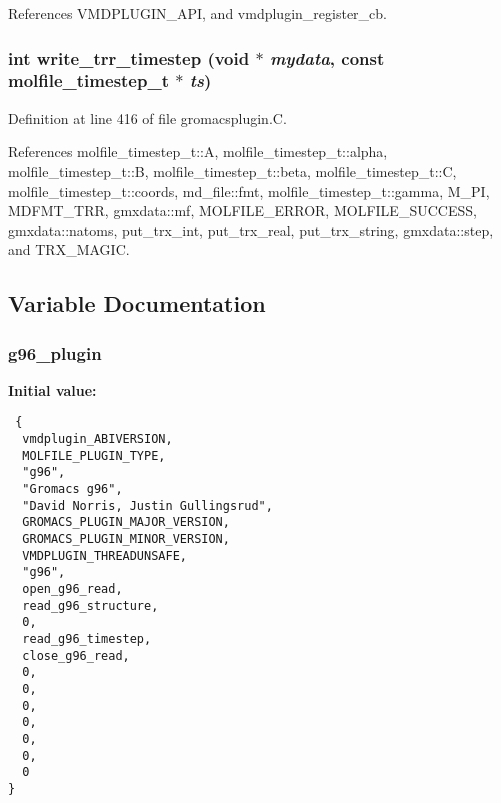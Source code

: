 References VMDPLUGIN\_\-API, and vmdplugin\_\-register\_\-cb.
\subsubsection{\setlength{\rightskip}{0pt plus 5cm}int write\_\-trr\_\-timestep (void $\ast$ {\em mydata}, const {\bf molfile\_\-timestep\_\-t} $\ast$ {\em ts})\hspace{0.3cm}{\tt  [static]}}\label{gromacsplugin_8C_a19}




Definition at line 416 of file gromacsplugin.C.

References molfile\_\-timestep\_\-t::A, molfile\_\-timestep\_\-t::alpha, molfile\_\-timestep\_\-t::B, molfile\_\-timestep\_\-t::beta, molfile\_\-timestep\_\-t::C, molfile\_\-timestep\_\-t::coords, md\_\-file::fmt, molfile\_\-timestep\_\-t::gamma, M\_\-PI, MDFMT\_\-TRR, gmxdata::mf, MOLFILE\_\-ERROR, MOLFILE\_\-SUCCESS, gmxdata::natoms, put\_\-trx\_\-int, put\_\-trx\_\-real, put\_\-trx\_\-string, gmxdata::step, and TRX\_\-MAGIC.

\subsection{Variable Documentation}
\subsubsection{ g96\_\-plugin\hspace{0.3cm}{\tt  [static]}}\label{gromacsplugin_8C_a4}


{\bf Initial value:}

\footnotesize\begin{verbatim} {
  vmdplugin_ABIVERSION,               
  MOLFILE_PLUGIN_TYPE,                
  "g96",                              
  "Gromacs g96",                      
  "David Norris, Justin Gullingsrud", 
  GROMACS_PLUGIN_MAJOR_VERSION,       
  GROMACS_PLUGIN_MINOR_VERSION,       
  VMDPLUGIN_THREADUNSAFE,             
  "g96",                              
  open_g96_read,
  read_g96_structure,
  0,
  read_g96_timestep,
  close_g96_read,
  0,                                  
  0,                                  
  0,                                  
  0,                                  
  0,                                  
  0,                                  
  0                                   
}\end{verbatim}\normalsize 


